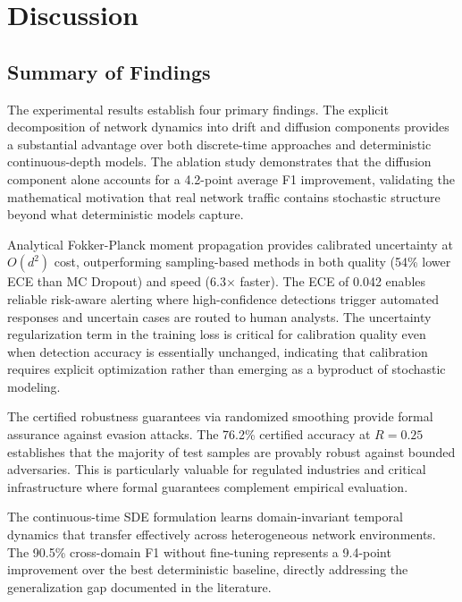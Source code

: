 \documentclass[journal]{IEEEtran}
\begin{document}
\section{Discussion}
\label{sec:discussion}

\subsection{Summary of Findings}

The experimental results establish four primary findings. The explicit decomposition of network dynamics into drift and diffusion components provides a substantial advantage over both discrete-time approaches and deterministic continuous-depth models. The ablation study demonstrates that the diffusion component alone accounts for a 4.2-point average F1 improvement, validating the mathematical motivation that real network traffic contains stochastic structure beyond what deterministic models capture.

Analytical Fokker-Planck moment propagation provides calibrated uncertainty at $O(d^2)$ cost, outperforming sampling-based methods in both quality (54\% lower ECE than MC Dropout) and speed (6.3$\times$ faster). The ECE of 0.042 enables reliable risk-aware alerting where high-confidence detections trigger automated responses and uncertain cases are routed to human analysts. The uncertainty regularization term in the training loss is critical for calibration quality even when detection accuracy is essentially unchanged, indicating that calibration requires explicit optimization rather than emerging as a byproduct of stochastic modeling.

The certified robustness guarantees via randomized smoothing provide formal assurance against evasion attacks. The 76.2\% certified accuracy at $R = 0.25$ establishes that the majority of test samples are provably robust against bounded adversaries. This is particularly valuable for regulated industries and critical infrastructure where formal guarantees complement empirical evaluation.

The continuous-time SDE formulation learns domain-invariant temporal dynamics that transfer effectively across heterogeneous network environments. The 90.5\% cross-domain F1 without fine-tuning represents a 9.4-point improvement over the best deterministic baseline, directly addressing the generalization gap documented in the literature.
\end{document}
